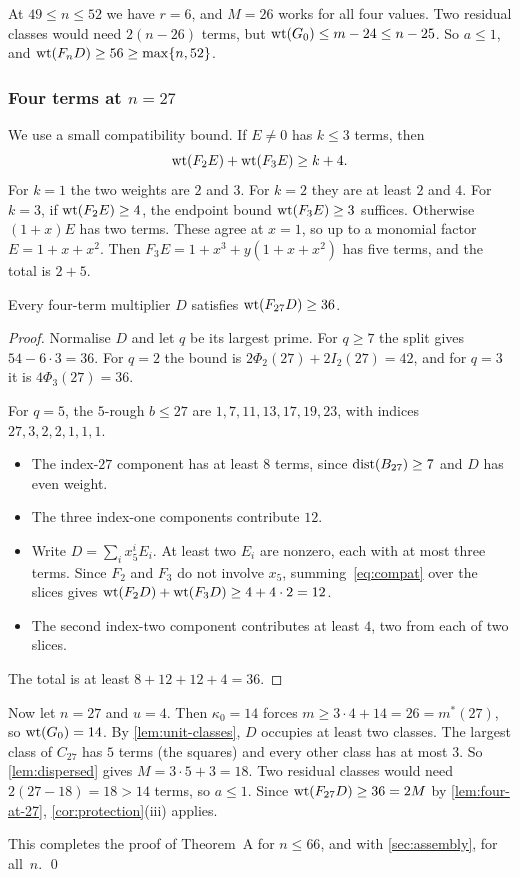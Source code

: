 At $49\le n\le52$ we have $r=6$, and $M=26$ works for all four values. Two residual classes would need $2(n-26)$ terms, but $\operatorname{wt}(G_0)\le m-24\le n-25$. So $a\le1$, and $\operatorname{wt}(F_nD)\ge56\ge\max\{n,52\}$.

\subsubsection*{Four terms at \texorpdfstring{$n=27$}{n = 27}}
We use a small compatibility bound. If $E\ne0$ has $k\le3$ terms, then
\begin{equation}\label{eq:compat}
 \operatorname{wt}(F_2E)+\operatorname{wt}(F_3E)\ge k+4 .
\end{equation}
For $k=1$ the two weights are $2$ and $3$. For $k=2$ they are at least $2$ and $4$. For $k=3$, if $\operatorname{wt}(F_2E)\ge4$, the endpoint bound $\operatorname{wt}(F_3E)\ge3$ suffices. Otherwise $(1+x)E$ has two terms. These agree at $x=1$, so up to a monomial factor $E=1+x+x^2$. Then $F_3E=1+x^3+y(1+x+x^2)$ has five terms, and the total is $2+5$.

\begin{lemma}\label{lem:four-at-27}
Every four-term multiplier $D$ satisfies $\operatorname{wt}(F_{27}D)\ge36$.
\end{lemma}

\begin{proof}
Normalise $D$ and let $q$ be its largest prime. For $q\ge7$ the split gives $54-6\cdot3=36$. For $q=2$ the bound is $2\Phi_2(27)+2I_2(27)=42$, and for $q=3$ it is $4\Phi_3(27)=36$.

For $q=5$, the $5$-rough $b\le27$ are $1,7,11,13,17,19,23$, with indices $27,3,2,2,1,1,1$.
\begin{itemize}
\item The index-$27$ component has at least $8$ terms, since $\operatorname{dist}(B_{27})\ge7$ and $D$ has even weight.
\item The three index-one components contribute $12$.
\item Write $D=\sum_ix_5^iE_i$. At least two $E_i$ are nonzero, each with at most three terms. Since $F_2$ and $F_3$ do not involve $x_5$, summing~\eqref{eq:compat} over the slices gives $\operatorname{wt}(F_2D)+\operatorname{wt}(F_3D)\ge4+4\cdot2=12$.
\item The second index-two component contributes at least $4$, two from each of two slices.
\end{itemize}
The total is at least $8+12+12+4=36$.
\end{proof}

Now let $n=27$ and $u=4$. Then $\kappa_0=14$ forces $m\ge3\cdot4+14=26=m^*(27)$, so $\operatorname{wt}(G_0)=14$. By \cref{lem:unit-classes}, $D$ occupies at least two classes. The largest class of $C_{27}$ has $5$ terms (the squares) and every other class has at most $3$. So \cref{lem:dispersed} gives $M=3\cdot5+3=18$. Two residual classes would need $2(27-18)=18>14$ terms, so $a\le1$. Since $\operatorname{wt}(F_{27}D)\ge36=2M$ by \cref{lem:four-at-27}, \cref{cor:protection}(iii) applies.

This completes the proof of Theorem~A for $n\le66$, and with \cref{sec:assembly}, for all~$n$. \qed
